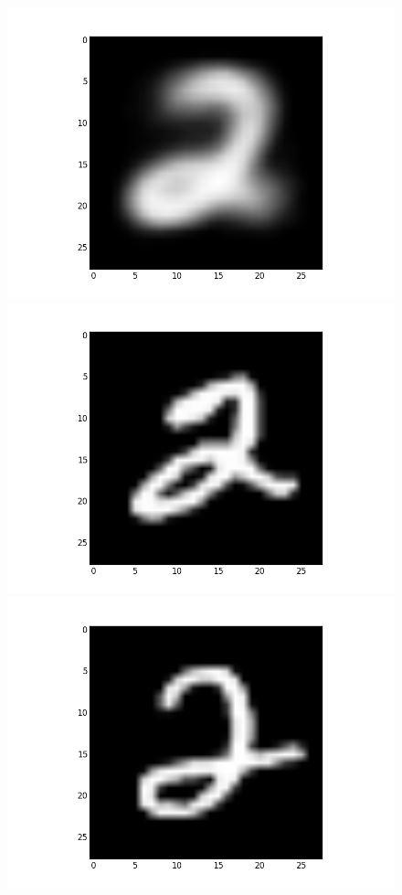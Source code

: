\documentclass[submit]{harvardml}
\begin{document}
\begin{figure}[ht]
    \centering
    \includegraphics[scale=0.20]{mean-5}
    \includegraphics[scale=0.20]{representative-5-0}
    \includegraphics[scale=0.20]{representative-5-1}

\end{figure}
\end{document}
